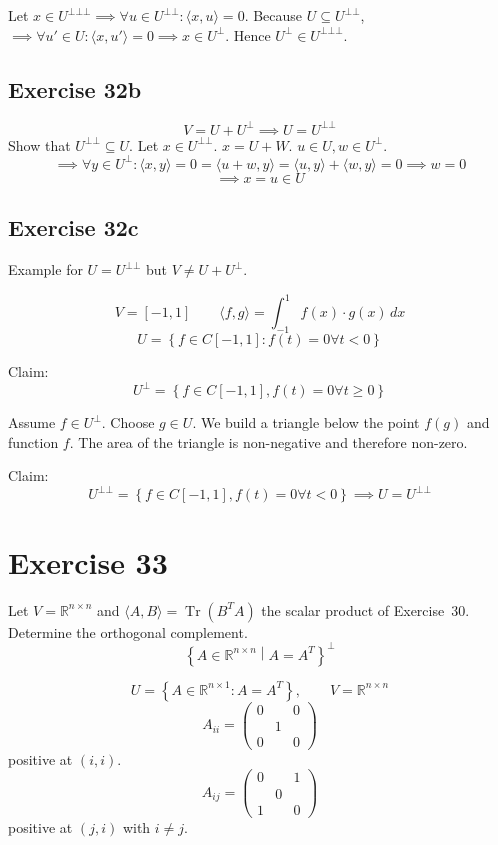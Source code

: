 \documentclass[a4paper]{article}
\theoremstyle{definition}
\newcommand\set[1]{\left\{#1\right\}}
\newcommand\ip[2]{\langle{#1},{#2}\rangle}
\begin{document}
Let $x \in U^{\bot\bot\bot} \implies \forall u \in U^{\bot\bot}: \ip xu = 0$.
Because $U \subseteq U^{\bot\bot}$, $\implies \forall u' \in U: \ip{x}{u'} = 0 \implies x \in U^{\bot}$.
Hence $U^{\bot} \in U^{\bot\bot\bot}$.

\subsection{Exercise 32b}

\[ V = U + U^{\bot} \implies U = U^{\bot\bot} \]
Show that $U^{\bot\bot} \subseteq U$.
Let $x \in U^{\bot\bot}$. $x = U + W$. $u \in U, w \in U^{\bot}$.
\[ \implies \forall y \in U^{\bot}: \ip xy = 0 = \ip{u+w}{y} = \ip uy + \ip wy = 0 \implies w = 0 \]
\[ \implies x = u \in U \]

\subsection{Exercise 32c}
Example for $U = U^{\bot\bot}$ but $V \neq U + U^{\bot}$.

\[ V = [-1,1] \qquad \ip fg = \int_{-1}^1 f(x) \cdot g(x) \, dx \]
\[ U = \set{f \in C[-1,1]: f(t) = 0 \forall t < 0} \]

Claim:
\[ U^{\bot} = \set{f \in C[-1,1], f(t) = 0 \forall t \geq 0} \]

Assume $f \in U^{\bot}$. Choose $g \in U$. We build a triangle below the point $f(g)$ and function $f$. The area of the triangle is non-negative and therefore non-zero.

Claim:
\[ U^{\bot\bot} = \set{f \in C[-1,1], f(t) = 0 \forall t < 0} \implies U = U^{\bot\bot} \]

\section{Exercise 33}
\begin{ex}
  Let $V = \mathbb R^{n\times n}$ and $\langle A,B\rangle = \operatorname{Tr}(B^TA)$ the scalar product of Exercise~30.
  Determine the orthogonal complement.
  \[ \set{A \in \mathbb R^{n\times n} \middle| A = A^T}^\bot \]
\end{ex}

\[ U = \set{A \in \mathbb R^{n\times 1}: A = A^T}, \qquad V = \mathbb R^{n\times n} \]
\[
  A_{ii} = \begin{pmatrix}
    0 &   & 0 \\
      & 1 & \\
    0 &   & 0
  \end{pmatrix}
\]
positive at $(i,i)$.
\[
  A_{ij} = \begin{pmatrix}
    0 &   & 1 \\
      & 0 &  \\
    1 &   & 0
  \end{pmatrix}
\]
positive at $(j,i)$ with $i \neq j$.
\end{document}
